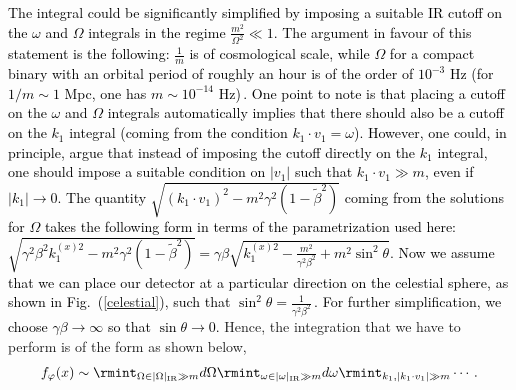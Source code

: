 \textcolor{black}{The integral could be significantly simplified by imposing a suitable IR cutoff on the $\omega$ and $\Omega$ integrals in the regime $\frac{m^2}{\Omega^2}\ll 1$. The argument in favour of this statement is the following: $\frac{1}{m}$ is of cosmological scale, while $\Omega$ for a compact binary with an orbital period of roughly an hour is of the order of $10^{-3}$ Hz (for $1/m \sim 1$ Mpc, one has $m \sim 10^{-14}$ Hz)\,. One point to note is that placing a cutoff on the $\omega$ and $\Omega$ integrals automatically implies that there should also be a cutoff on the $k_1$ integral (coming from the condition $k_1\cdot v_1=\omega$). However, one could, in principle, argue that instead of imposing the cutoff directly on the $k_1$ integral, one should impose a suitable condition on $|v_1|$ such that $k_1\cdot v_1\gg m$, even if $|k_1|\rightarrow 0$. The quantity $\sqrt{(k_1\cdot v_1)^2-m^2\gamma^2(1-\tilde\beta^2)}$ coming from the solutions for $\Omega$ takes the following form in terms of the parametrization used here: $\sqrt{\gamma^2\beta^2 k_1^{(x)2}-m^2\gamma^2(1-\tilde\beta^2)}=\gamma\beta \sqrt{k_1^{(x)2}-\frac{m^2}{\gamma^2\beta^2}+m^2\sin^2\theta}$. Now we assume that we can place our detector at a particular direction on the celestial sphere, as shown in Fig.~(\ref{celestial}), such that $\sin^2\theta=\frac{1}{\gamma^2\beta^2}\,.$ For further simplification, we choose $\gamma\beta\rightarrow \infty$ so that $\sin \theta\rightarrow 0$.}
Hence, the integration that we have to perform is of the form as shown below,
\begin{align}
    \begin{split}
        f_{\varphi}(x)\sim \rmint_{\Omega \in| \Omega|_{\textrm{IR}}\gg m}d\Omega\rmint_{\omega \in |\omega|_{\textrm{IR}}\gg m}d\omega\rmint_{k_1,|k_1\cdot v_1|\gg m}\cdots\,.
    \end{split}
\end{align}

